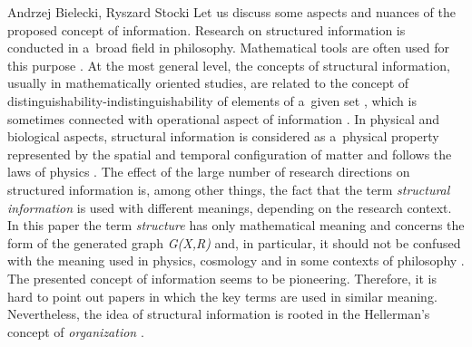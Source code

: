 \begin{artengenv2auth}{Andrzej Bielecki, Ryszard Stocki}
Let us discuss some aspects and nuances of the proposed concept of information. Research on structured information is conducted in a~broad field in philosophy. Mathematical tools are often used for this purpose 
\parencite[][]{schroeder_analogy_2019}. %
 At the most general level, the concepts of structural information, usually in mathematically oriented studies, are related to the concept of distinguishability-indistinguishability of elements of a~given set 
\parencite[][]{dodig-crnkovic_theoretical_2019}, %
 which is sometimes connected with operational aspect of information 
\parencite[][]{bateson_information_1951}. %
 In physical and biological aspects, structural information is considered as a~physical property represented by the spatial and temporal configuration of matter and follows the laws of physics 
\parencites[][]{ebeling_selforganization_2015}[][]{davies_demon_2019}. %
 The effect of the large number of research directions on structured information is, among other things, the fact that the term \textit{structural information} is used with different meanings, depending on the research context. In this paper the term \textit{structure} has only mathematical meaning and concerns the form of the generated graph \textit{G(X,R)} and, in particular, it should not be confused with the meaning used in physics, cosmology and in some contexts of philosophy 
\parencite[see.g][]{burgin_information_2011}. %
 The presented concept of information seems to be pioneering. Therefore, it is hard to point out papers in which the key terms are used in similar meaning. Nevertheless, the idea of structural information is rooted in the Hellerman's concept of \textit{organization}  
\parencites[see][]{hellerman_representation_2006}[][]{hellerman_animate_2016}.%





\end{artengenv2auth}
